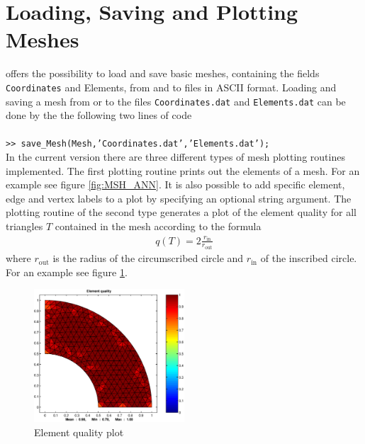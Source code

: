 \section{Loading, Saving and Plotting Meshes}
\label{sect:IO}

\LIBNAME offers the possibility to load and save basic meshes, containing the fields {\tt Coordinates} and {Elements},
from and to files in ASCII format. Loading and saving a mesh from or to the files {\tt Coordinates.dat} and
{\tt Elements.dat} can be done by the the following two lines of code \\

 \\
{\tt >> save\_Mesh(Mesh,'Coordinates.dat','Elements.dat');} \\

In the current version there are three different types of mesh plotting routines implemented. The first plotting routine
prints out the elements of a mesh. For an example see figure \ref{fig:MSH_ANN}. It is also possible to add specific element,
edge and vertex labels to a plot by specifying an optional string argument. The plotting routine of the second type generates
a plot of the element quality for all triangles $T$ contained in the mesh according to the formula
\begin{eqnarray}
\label{eq:ELEM_QUAL}
  q(T) = 2\frac{r_{\operatorname{in}}}{r_{\operatorname{out}}}
\end{eqnarray}
where $r_{\operatorname{out}}$ is the radius of the circumscribed circle and $r_{\operatorname{in}}$ of the inscribed
circle. For an example see figure \ref{fig:ELEM_QUAL}.

\begin{figure}[htb]
  \centering
  \includegraphics[width=0.5\textwidth]{qual.eps}
  \caption{Element quality plot}
  \label{fig:ELEM_QUAL}
\end{figure}

